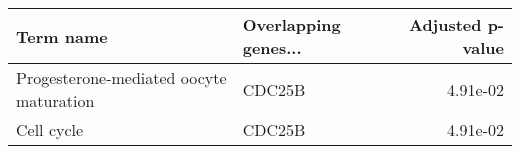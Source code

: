\begin{tabular}{llr}
\toprule
                              Term name & Overlapping genes... &  Adjusted p-value \\
\midrule
Progesterone-mediated oocyte maturation &               CDC25B &          4.91e-02 \\
                             Cell cycle &               CDC25B &          4.91e-02 \\
\bottomrule
\end{tabular}
